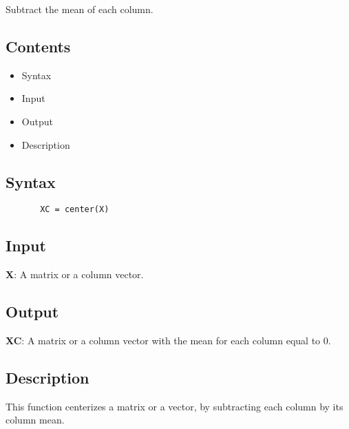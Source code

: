 \documentclass[a4paper,11pt,openany]{memoir}
\begin{document}
\begin{par}
Subtract the mean of each column.
\end{par} \vspace{1em}

\subsection*{Contents}

\begin{itemize}
\setlength{\itemsep}{-1ex}
   \item Syntax
   \item Input
   \item Output
   \item Description
\end{itemize}


\subsection*{Syntax}


\begin{verbatim}       XC = center(X)\end{verbatim}
    

\subsection*{Input}

\begin{par}
\textbf{X}: A matrix or a column vector.
\end{par} \vspace{1em}


\subsection*{Output}

\begin{par}
\textbf{XC}: A matrix or a column vector with the mean for each column equal to 0.
\end{par} \vspace{1em}


\subsection*{Description}

\begin{par}
This function centerizes a matrix or a vector, by subtracting each column by its column mean.
\end{par} \vspace{1em}
\end{document}
